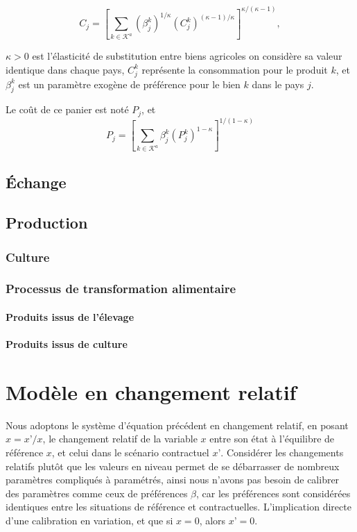 \begin{equation}
	C_j = \left[ \sum_{k \in \mathcal{K}^a} (\beta_{j}^k)^{1/\kappa} (C_{j}^k)^{(\kappa-1)/\kappa} \right]^{\kappa/(\kappa-1)},
\end{equation}

$\kappa > 0$ est l’élasticité de substitution entre biens agricoles on considère sa valeur identique dans chaque pays, $C_j^k$ représente la consommation pour le produit $k$, et $\beta_{j}^k$ est un paramètre exogène de préférence pour le bien $k$ dans le pays $j$.

Le coût de ce panier est noté $P_j$, et
\begin{equation}
	P_j = \left[ \sum_{k \in \mathcal{K}^a} \beta_{j}^k (P_{j}^k)^{1-\kappa} \right]^{1/(1-\kappa)}
\end{equation}

\subsection{Échange}

\subsection{Production}

\subsubsection{Culture}

\subsubsection{Processus de transformation alimentaire}

\paragraph{Produits issus de l’élevage}

\paragraph{Produits issus de culture}


\section{Modèle en changement relatif}
Nous adoptons le système d’équation précédent en changement relatif, en posant $\hat{x} = x’/x$, le changement relatif de la variable $x$ entre son état à l’équilibre de référence $x$, et celui dans le scénario contractuel $x’$. Considérer les changements relatifs plutôt que les valeurs en niveau permet de se débarrasser de nombreux paramètres compliqués à paramétrés, ainsi nous n’avons pas besoin de calibrer des paramètres comme ceux de préférences $\beta$, car les préférences sont considérées identiques entre les situations de référence et contractuelles. L’implication directe d’une calibration en variation, et que si $x = 0$, alors $x’ = 0$.
